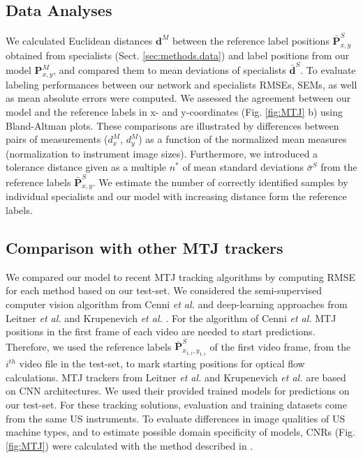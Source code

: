 \documentclass[journal,twoside,web]{ieeecolor}
\begin{document}
\subsection{Data Analyses}
\label{sec:data_analysis}
We calculated Euclidean distances $\boldsymbol{d}^{M}$ between the reference label positions $\bar{\boldsymbol{P}}^{S}_{x,y}$ obtained from specialists (Sect. \ref{sec:methods.data}) and label positions from our model $\boldsymbol{P}^{M}_{x,y}$, and compared them to mean deviations of specialists $\bar{\boldsymbol{d}}^{S}$. To evaluate labeling performances between our network and specialists RMSEs, SEMs, as well as mean absolute errors were computed. We assessed the agreement between our model and the reference labels in x- and y-coordinates (Fig. \ref{fig:MTJ} b) using Bland-Altman plots. These comparisons are illustrated by differences between pairs of measurements (${d}^{M}_{x}$, ${d}^{M}_{y}$) as a function of the normalized mean measures (normalization to instrument image sizes). Furthermore, we introduced a tolerance distance given as a multiple $n^{*}$ of mean standard deviations $\bar{\sigma}^{S}$ from the reference labels $\bar{\boldsymbol{P}}^{S}_{x,y}$. We estimate the number of correctly identified samples by individual specialists and our model with increasing distance form the reference labels.

\vspace{0.1cm}
\subsection*{Comparison with other MTJ trackers}
We compared our model to recent MTJ tracking algorithms by computing RMSE for each method based on our test-set. We considered the semi-supervised computer vision algorithm from Cenni \textit{et al.} \cite{j:Cenni2019} and deep-learning approaches from Leitner \textit{et al.} \cite{c:LeitnerJarolim2020} and Krupenevich \textit{et al.} \cite{j:Krupenevich2021}. For the algorithm of Cenni \textit{et al.} MTJ positions in the first frame of each video are needed to start predictions. Therefore, we used the reference labels $\bar{\boldsymbol{P}}^{S}_{x_{1,i},y_{1,i}}$ of the first video frame, from the $i^{th}$ video file in the test-set, to mark starting positions for optical flow calculations. MTJ trackers from Leitner \textit{et al.} \cite{c:LeitnerJarolim2020} and Krupenevich \textit{et al.} \cite{j:Krupenevich2021} are based on CNN architectures. We used their provided trained models for predictions on our test-set. For these tracking solutions, evaluation and training datasets come from the same US instruments. To evaluate differences in image qualities of US machine types, and to estimate possible domain specificity of models, CNRs (Fig. \ref{fig:MTJ}) were calculated with the method described in \cite{c:Leitner2021}.
\end{document}
